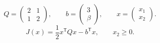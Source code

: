 \[
Q=\begin{pmatrix}2&1\\1&2\end{pmatrix},\qquad
b=\begin{pmatrix}3\\\beta\end{pmatrix},\qquad
x=\begin{pmatrix}x_1\\x_2\end{pmatrix}.
\]
\begin{equation}\label{eq:objective}
J(x)=\frac12 x^{\mathsf T}Qx-b^{\mathsf T}x,
\qquad x_2\ge0.
\end{equation}

